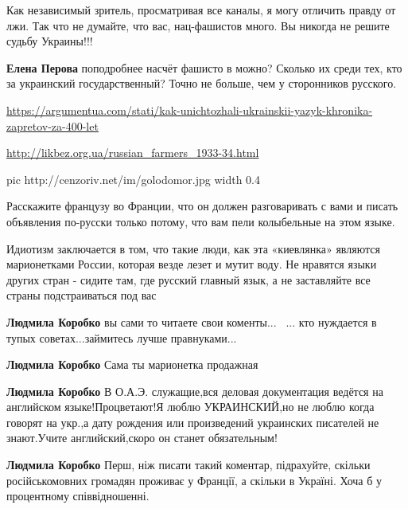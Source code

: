 \begin{itemize}
{

Как независимый зритель, просматривая все каналы, я могу отличить правду от
лжи. Так что не думайте, что вас, нац-фашистов много. Вы никогда не решите
судьбу Украины!!!

\begin{itemize}
\textbf{Елена Перова} поподробнее насчёт фашисто в можно? Сколько их среди тех, кто за украинский государственный? Точно не больше, чем у сторонников русского.


\url{https://argumentua.com/stati/kak-unichtozhali-ukrainskii-yazyk-khronika-zapretov-za-400-let}\par
\url{http://likbez.org.ua/russian_farmers_1933-34.html}\par

\ifcmt
  pic http://cenzoriv.net/im/golodomor.jpg
  width 0.4
\fi

\end{itemize}


Расскажите французу во Франции, что он должен разговаривать с вами и писать
объявления по-русски только потому, что вам пели колыбельные на этом языке.

Идиотизм заключается в том, что такие люди, как эта «киевлянка» являются
марионетками России, которая везде лезет и мутит воду. Не нравятся языки других
стран - сидите там, где русский главный язык, а не заставляйте все страны
подстраиваться под вас

\begin{itemize}

\textbf{Людмила Коробко} вы сами то читаете свои коменты...🤣🤣🤣... кто нуждается в
тупых советах...займитесь лучше правнуками...

\textbf{Людмила Коробко} Сама ты марионетка продажная

\textbf{Людмила Коробко} В О.А.Э. служащие,вся деловая документация ведётся на
английском языке!Процветают!Я люблю УКРАИНСКИЙ,но не люблю когда говорят на
укр.,а дату рождения или произведений украинских писателей не знают.Учите
английский,скоро он станет обязательным!

\textbf{Людмила Коробко} Перш, ніж писати такий коментар, підрахуйте, скільки
російськомовних громадян проживає у Франції, а скільки в Україні. Хоча б у
процентному співвідношенні.


\end{itemize}}
\end{itemize}
